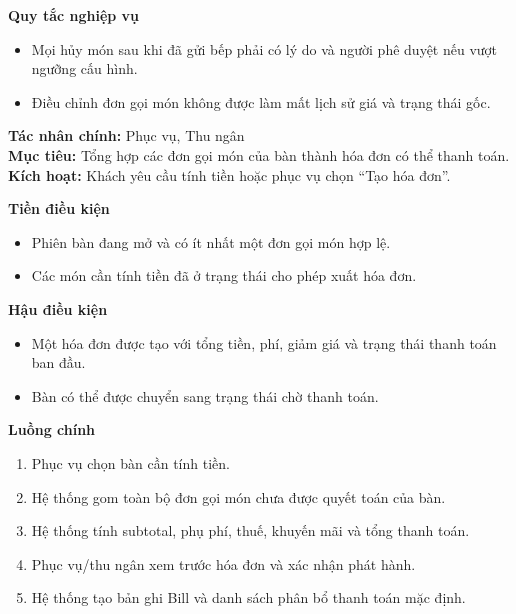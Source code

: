 \documentclass[11pt,a4paper]{article}
\begin{document}
\begin{usecasebox}[title={UC-ORD-04 --- Sửa hoặc hủy dòng món}]
    \textbf{Quy tắc nghiệp vụ}
    \begin{itemize}[leftmargin=1.8em]
  \item Mọi hủy món sau khi đã gửi bếp phải có lý do và người phê duyệt nếu vượt ngưỡng cấu hình.
  \item Điều chỉnh đơn gọi món không được làm mất lịch sử giá và trạng thái gốc.
\end{itemize}
    \end{usecasebox}



    \begin{usecasebox}[title={UC-BIL-01 --- Tạo hóa đơn cho bàn}]
    \textbf{Tác nhân chính:} Phục vụ, Thu ngân\\
    \textbf{Mục tiêu:} Tổng hợp các đơn gọi món của bàn thành hóa đơn có thể thanh toán.\\
    \textbf{Kích hoạt:} Khách yêu cầu tính tiền hoặc phục vụ chọn \enquote{Tạo hóa đơn}.

    \medskip
    \textbf{Tiền điều kiện}
    \begin{itemize}[leftmargin=1.8em]
  \item Phiên bàn đang mở và có ít nhất một đơn gọi món hợp lệ.
  \item Các món cần tính tiền đã ở trạng thái cho phép xuất hóa đơn.
\end{itemize}

    \textbf{Hậu điều kiện}
    \begin{itemize}[leftmargin=1.8em]
  \item Một hóa đơn được tạo với tổng tiền, phí, giảm giá và trạng thái thanh toán ban đầu.
  \item Bàn có thể được chuyển sang trạng thái chờ thanh toán.
\end{itemize}

    \textbf{Luồng chính}
    \begin{enumerate}[leftmargin=1.8em]
  \item Phục vụ chọn bàn cần tính tiền.
  \item Hệ thống gom toàn bộ đơn gọi món chưa được quyết toán của bàn.
  \item Hệ thống tính subtotal, phụ phí, thuế, khuyến mãi và tổng thanh toán.
  \item Phục vụ/thu ngân xem trước hóa đơn và xác nhận phát hành.
  \item Hệ thống tạo bản ghi \textsf{Bill} và danh sách phân bổ thanh toán mặc định.
\end{enumerate}


\end{usecasebox}
\end{document}

